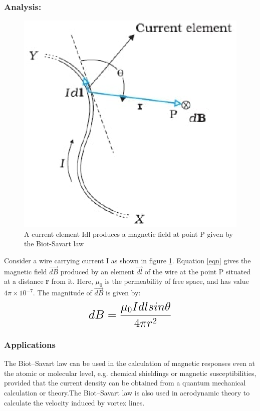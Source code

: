 \subsubsection{Analysis:}
\begin{figure}[h]
	{\begin{center}
		\includegraphics[scale=0.9]{ME20B029.eps}
	\end{center}}
	\caption{A current element Idl produces a magnetic field at point P given by the Biot-Savart law \cite{picture}}
	\label{fig}
\end{figure}
Consider a wire carrying current I as shown in figure \ref{fig}. Equation \ref{eqn} gives the magnetic field {$\vec{dB}$} produced by an element {$\vec{dl}$} 
of the wire at the point P situated at a distance {\textbf{r}} from it. Here, {$\mu_{0}$} is the permeability of free space, and has value {$4\pi\times10^{-7}$}.\cite{webref2}
The magnitude of {$\vec{dB}$} is given by: 
\begin{equation}
{\LARGE{\textbf{${dB}=\frac{\mu_{0} Idlsin\theta}{4\pi r^2}$}}}
\end{equation}
\subsubsection{Applications}
The Biot–Savart law can be used in the calculation of magnetic responses even at the atomic or molecular level, e.g. chemical shieldings or magnetic susceptibilities, provided that the current density can be obtained from a quantum mechanical calculation or theory.The Biot–Savart law is also used in aerodynamic theory to calculate the velocity induced by vortex lines.\cite{webref1}
